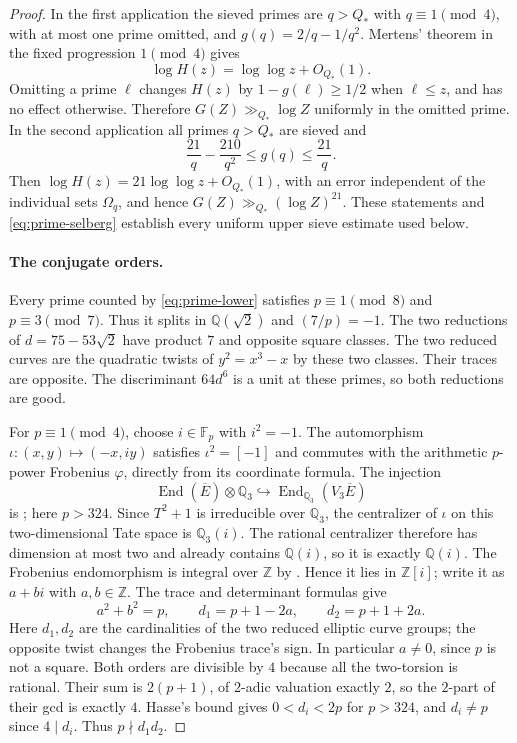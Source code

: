 \documentclass[11pt]{article}
\theoremstyle{definition}
\theoremstyle{remark}
\newcommand{\Q}{\mathbb Q}
\newcommand{\Z}{\mathbb Z}
\newcommand{\F}{\mathbb F}
\begin{document}
\begin{proof}
In the first application the sieved primes are
$q>Q_*$ with $q\equiv1\pmod4$, with at most one prime omitted,
and $g(q)=2/q-1/q^2$. Mertens' theorem in the fixed progression
$1\pmod4$ \cite[Theorem 1]{williams-mertens} gives
\[
 \log H(z)=\log\log z+O_{Q_*}(1).
\]
Omitting a prime $\ell$ changes $H(z)$ by $1-g(\ell)\ge1/2$
when $\ell\le z$, and has no effect otherwise. Therefore
$G(Z)\gg_{Q_*}\log Z$ uniformly in the omitted prime.
In the second application all primes $q>Q_*$ are sieved and
\[
 \frac{21}{q}-\frac{210}{q^2}\le g(q)\le\frac{21}{q}.
\]
Then $\log H(z)=21\log\log z+O_{Q_*}(1)$, with an error
independent of the individual sets $\Omega_q$, and hence
$G(Z)\gg_{Q_*}(\log Z)^{21}$. These statements and
\eqref{eq:prime-selberg} establish every uniform upper sieve
estimate used below.

\paragraph{The conjugate orders.}
Every prime counted by \eqref{eq:prime-lower} satisfies
$p\equiv1\pmod8$ and $p\equiv3\pmod7$. Thus it splits in
$\mathbb Q(\sqrt2)$ and $(7/p)=-1$. The two reductions of
$d=75-53\sqrt2$ have product $7$ and opposite square classes.
The two reduced curves are the quadratic twists of $y^2=x^3-x$
by these two classes. Their traces are opposite. The discriminant
$64d^6$ is a unit at these primes, so both reductions are good.

For $p\equiv1\pmod4$, choose $i\in\F_p$ with $i^2=-1$.
The automorphism $\iota:(x,y)\mapsto(-x,iy)$ satisfies
$\iota^2=[-1]$ and commutes with the arithmetic $p$-power
Frobenius $\varphi$, directly from its coordinate formula.
The injection
\[
 \operatorname{End}(\overline E)\otimes\Q_3
 \hookrightarrow\operatorname{End}_{\Q_3}(V_3\overline E)
\]
is \cite[III.7.4, pp.~89--91]{silverman}; here $p>324$.
Since $T^2+1$ is irreducible over $\Q_3$, the centralizer of
$\iota$ on this two-dimensional Tate space is $\Q_3(i)$.
The rational centralizer therefore has dimension at most two
and already contains $\Q(i)$, so it is exactly $\Q(i)$.
The Frobenius endomorphism is integral over $\Z$ by
\cite[V.2.3.1(b), p.~142]{silverman}. Hence it lies in $\Z[i]$;
write it as $a+bi$ with $a,b\in\Z$.
The trace and determinant formulas
\cite[III.8.6, p.~99]{silverman} give
\[
 a^2+b^2=p,\qquad d_1=p+1-2a,\qquad d_2=p+1+2a.
\]
Here $d_1,d_2$ are the cardinalities of the two reduced elliptic
curve groups; the opposite twist changes the Frobenius trace's
sign. In particular $a\ne0$, since $p$ is not a square.
Both orders are divisible by $4$ because all the two-torsion is
rational. Their sum is $2(p+1)$, of $2$-adic valuation exactly
$2$, so the $2$-part of their gcd is exactly $4$. Hasse's bound
\cite[V.1.1, p.~138]{silverman}
gives $0<d_i<2p$ for $p>324$, and $d_i\ne p$ since $4\mid d_i$.
Thus $p\nmid d_1d_2$.


\end{proof}
\end{document}
